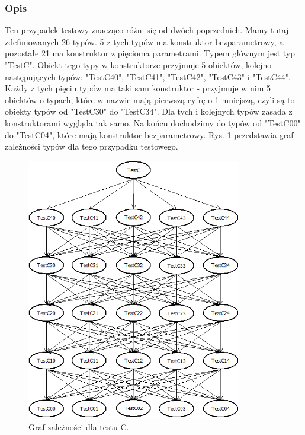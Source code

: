 \documentclass[12pt]{article}
\begin{document}
\subsubsection{Opis}
Ten przypadek testowy znacząco różni się od dwóch poprzednich. Mamy tutaj zdefiniowanych 26 typów. 5 z tych typów ma konstruktor bezparametrowy, a pozostałe 21 ma konstruktor z pięcioma parametrami. Typem głównym jest typ "TestC". Obiekt tego typy w konstruktorze przyjmuje 5 obiektów, kolejno następujących typów: "TestC40", "TestC41", "TestC42", "TestC43" i "TestC44". Każdy z tych pięciu typów ma taki sam konstruktor - przyjmuje w nim 5 obiektów o typach, które w nazwie mają pierwszą cyfrę o 1 mniejszą, czyli są to obiekty typów od "TestC30" do "TestC34". Dla tych i kolejnych typów zasada z konstruktorami wygląda tak samo. Na końcu dochodzimy do typów od "TestC00" do "TestC04", które mają konstruktor bezparametrowy. Rys. \ref{fig:testC} przedstawia graf zależności typów dla tego przypadku testowego.\\
\begin{figure}[H]
	\begin{center}
  		\includegraphics[height=11.5cm]{TestC.png}
  		\caption{Graf zależności dla testu C.}
  		\label{fig:testC}
	\end{center}
\end{figure}
\end{document}
